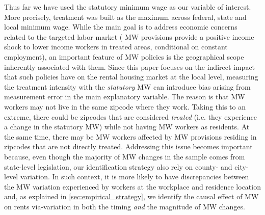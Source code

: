 Thus far we have used the statutory minimum wage as our variable of interest. More 
precisely, treatment was built as the maximum across federal, state and local minimum wage.
While the main goal is to address economic concerns related to the targeted labor market (
MW provisions provide a positive income shock to lower income workers in treated areas, conditional 
on constant employment), an important feature of MW policies is the geographical scope 
inherently associated with them.  
Since this paper focuses on the indirect impact that such policies have on 
the rental housing market at the local level, measuring the treatment intensity with the \textit{statutory} 
MW can introduce bias arising from measurement error in the main 
explanatory variable. The reason is that MW workers may not live in the same zipcode where they work. 
Taking this to an extreme, there could be zipcodes that are considered \textit{treated} (i.e. they experience a 
change in the statutory MW) while not having MW workers as residents.  At the same time, there may be 
MW workers affected by MW provisions residing in zipcodes that are not directly treated. Addressing this issue 
becomes important because, even though the majority of MW changes in the sample comes from state-level 
legislation, our identification strategy also rely on county- and city-level variation. In such context, it is more 
likely to have discrepancies between the MW variation experienced by workers at the workplace and residence 
location and, as explained in \autoref{sec:empirical_strategy}, we identify the causal effect of MW on 
rents via-variation in both the timing \textit{and} the magnitude of MW changes. 

